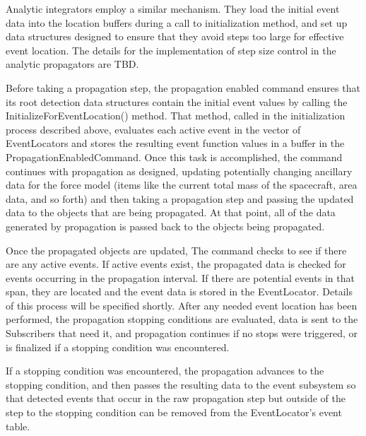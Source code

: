 \documentclass[letterpaper,10pt]{article}
\begin{document}
Analytic integrators employ a similar mechanism.  They load the initial event
data into the location buffers during a call to initialization method, and set
up data structures designed to ensure that they avoid steps too large for
effective event location. The details for the implementation of step size
control in the analytic propagators are TBD.

Before taking a propagation step, the propagation enabled command ensures that
its root detection data structures contain the initial event values by calling
the InitializeForEventLocation() method.  That method, called in the
initialization process described above, evaluates each active event in the vector
of EventLocators and stores the resulting event function values in a buffer in
the PropagationEnabledCommand.  Once this task is accomplished, the command
continues with propagation as designed, updating potentially changing ancillary
data for the force model (items like the current total mass of the spacecraft,
area data, and so forth) and then taking a propagation step and passing the
updated data to the objects that are being propagated.  At that point, all of
the data generated by propagation is passed back to the objects being
propagated.

Once the propagated objects are updated, The command checks to see if there are
any active events. If active events exist, the propagated data is checked
for events occurring in the propagation interval.  If there are potential
events in that span, they are located and the event data is stored in the
EventLocator.  Details of this process will be specified shortly.  After
any needed event location has been performed, the propagation stopping
conditions are evaluated, data is sent to the Subscribers that need it, and
propagation continues if no stops were triggered, or is finalized if a stopping
condition was encountered.

If a stopping condition was encountered, the propagation advances to the
stopping condition, and then passes the resulting data to the event subsystem so
that detected events that occur in the raw propagation step but outside of the
step to the stopping condition can be removed from the EventLocator's event
table.
\end{document}
